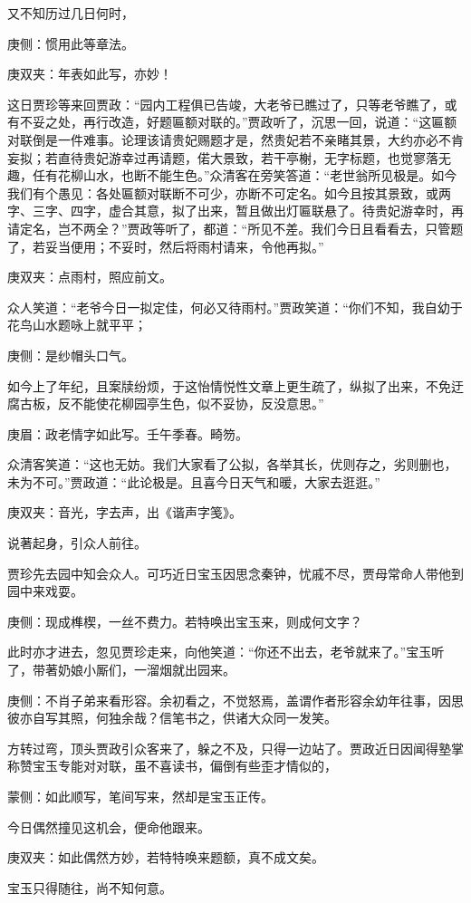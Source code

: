 \begin{parag}
    又不知历过几日何时，\begin{note}庚侧：惯用此等章法。\end{note}\begin{note}庚双夹：年表如此写，亦妙！\end{note}这日贾珍等来回贾政：“园内工程俱已告竣，大老爷已瞧过了，只等老爷瞧了，或有不妥之处，再行改造，好题匾额对联的。”贾政听了，沉思一回，说道：“这匾额对联倒是一件难事。论理该请贵妃赐题才是，然贵妃若不亲睹其景，大约亦必不肯妄拟；若直待贵妃游幸过再请题，偌大景致，若干亭榭，无字标题，也觉寥落无趣，任有花柳山水，也断不能生色。”众清客在旁笑答道：“老世翁所见极是。如今我们有个愚见：各处匾额对联断不可少，亦断不可定名。如今且按其景致，或两字、三字、四字，虚合其意，拟了出来，暂且做出灯匾联悬了。待贵妃游幸时，再请定名，岂不两全？”贾政等听了，都道：“所见不差。我们今日且看看去，只管题了，若妥当便用；不妥时，然后将雨村请来，令他再拟。”\begin{note}庚双夹：点雨村，照应前文。\end{note}众人笑道：“老爷今日一拟定佳，何必又待雨村。”贾政笑道：“你们不知，我自幼于花鸟山水题咏上就平平；\begin{note}庚侧：是纱帽头口气。\end{note}如今上了年纪，且案牍纷烦，于这怡情悦性文章上更生疏了，纵拟了出来，不免迂腐古板，反不能使花柳园亭生色，似不妥协，反没意思。”\begin{note}庚眉：政老情字如此写。壬午季春。畸笏。\end{note}众清客笑道：“这也无妨。我们大家看了公拟，各举其长，优则存之，劣则删也，未为不可。”贾政道：“此论极是。且喜今日天气和暖，大家去逛逛。”\begin{note}庚双夹：音光，字去声，出《谐声字笺》。\end{note}说著起身，引众人前往。
\end{parag}


\begin{parag}
    贾珍先去园中知会众人。可巧近日宝玉因思念秦钟，忧戚不尽，贾母常命人带他到园中来戏耍。\begin{note}庚侧：现成榫楔，一丝不费力。若特唤出宝玉来，则成何文字？\end{note}此时亦才进去，忽见贾珍走来，向他笑道：“你还不出去，老爷就来了。”宝玉听了，带著奶娘小厮们，一溜烟就出园来。\begin{note}庚侧：不肖子弟来看形容。余初看之，不觉怒焉，盖谓作者形容余幼年往事，因思彼亦自写其照，何独余哉？信笔书之，供诸大众同一发笑。\end{note}方转过弯，顶头贾政引众客来了，躲之不及，只得一边站了。贾政近日因闻得塾掌称赞宝玉专能对对联，虽不喜读书，偏倒有些歪才情似的，\begin{note}蒙侧：如此顺写，笔间写来，然却是宝玉正传。\end{note}今日偶然撞见这机会，便命他跟来。\begin{note}庚双夹：如此偶然方妙，若特特唤来题额，真不成文矣。\end{note}宝玉只得随往，尚不知何意。
\end{parag}


